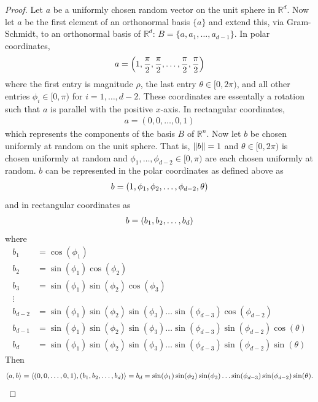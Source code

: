 \documentclass{article} %
\theoremstyle{plain}
\def\Rl{\mathbb{R}}
\newcommand{\VEC}[2]{\left\langle #1, #2 \right\rangle}
\numberwithin{equation}{section} %
\numberwithin{figure}{section} %
\numberwithin{table}{section} %
\begin{document}
\begin{proof}
    Let $a$ be a uniformly chosen random vector on the unit sphere in $\Rl^d$.  Now let $a$ be the first element of an orthonormal basis $\{a\}$ and extend this, via Gram-Schmidt, to an orthonormal basis of $\Rl^d$: $B = \{a, a_1, \dots, a_{d-1}\}$.  In polar coordinates,
    \begin{align*}
        a = \qty(1, \frac{\pi}{2}, \frac{\pi}{2}, \dots, \frac{\pi}{2}, \frac{\pi}{2})
    \end{align*}
    where the first entry is magnitude $\rho$, the last entry $\theta \in [0, 2\pi)$, and all other entries $\phi_i \in [0, \pi)$ for $i = 1, \dots, d-2$.  These coordinates are essentally a rotation such that $a$ is parallel with the positive $x$-axis.  In rectangular coordinates,
    \begin{align*}
        a = (0, 0, \dots, 0, 1)
    \end{align*}
    which represents the components of the basis $B$ of $\Rl^n$.  Now let $b$ be chosen uniformly at random on the unit sphere.  That is, $\norm{b} = 1$ and $\theta \in [0,2\pi)$ is chosen uniformly at random and $\phi_1, \dots, \phi_{d-2} \in [0, \pi)$ are each chosen uniformly at random.  $b$ can be represented in the polar coordinates as defined above as
    \begin{align*}
        b = \qty(1, \phi_1, \phi_2, \dots, \phi_{d-2}, \theta)
    \end{align*}
    and in rectangular coordinates as
    \begin{align*}
        b = \qty(b_1, b_2, \dots, b_d)
    \end{align*}
    where
    \begin{align*}
        b_1 &= \cos(\phi_1) \\
        b_2 &= \sin(\phi_1)\cos(\phi_2) \\
        b_3 &= \sin(\phi_1)\sin(\phi_2)\cos(\phi_3) \\
        \vdots\ \ & \\
        b_{d-2} &= \sin(\phi_1)\sin(\phi_2)\sin(\phi_3)\dots\sin(\phi_{d-3})\cos(\phi_{d-2})\\
        b_{d-1} &= \sin(\phi_1)\sin(\phi_2)\sin(\phi_3)\dots\sin(\phi_{d-3})\sin(\phi_{d-2})\cos(\theta) \\
        b_d &= \sin(\phi_1)\sin(\phi_2)\sin(\phi_3)\dots\sin(\phi_{d-3})\sin(\phi_{d-2})\sin(\theta)
    \end{align*}
    Then
    \begin{align*}
        \VEC{a}{b} = \VEC{(0, 0, \dots, 0, 1)}{\qty(b_1, b_2, \dots, b_d)} = b_d = \sin(\phi_1)\sin(\phi_2)\sin(\phi_3)\dots\sin(\phi_{d-3})\sin(\phi_{d-2})\sin(\theta).

\end{align*}
\end{proof}
\end{document}

